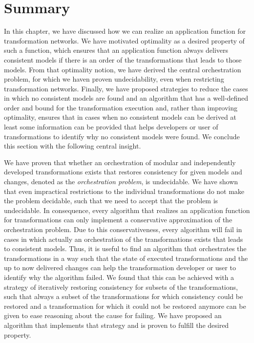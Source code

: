 \section{Summary}

In this chapter, we have discussed how we can realize an application function for transformation networks.
We have motivated optimality as a desired property of such a function, which ensures that an application function always delivers consistent models if there is an order of the transformations that leads to those models. 
From that optimality notion, we have derived the central orchestration problem, for which we haven proven undecidability, even when restricting transformation networks.
Finally, we have proposed strategies to reduce the cases in which no consistent models are found and an algorithm that has a well-defined order and bound for the transformation execution and, rather than improving optimality, ensures that in cases when no consistent models can be derived at least some information can be provided that helps developers or user of transformations to identify why no consistent models were found.
We conclude this section with the following central insight.

\begin{insight}[Orchestration]
    We have proven that whether an orchestration of modular and independently developed transformations exists that restores consistency for given models and changes, denoted as the \emph{orchestration problem}, is undecidable.
    We have shown that even impractical restrictions to the individual transformations do not make the problem decidable, such that we need to accept that the problem is undecidable.
    In consequence, every algorithm that realizes an application function for transformations can only implement a conservative approximation of the orchestration problem.
    Due to this conservativeness, every algorithm will fail in cases in which actually an orchestration of the transformations exists that leads to consistent models.
    Thus, it is useful to find an algorithm that orchestrates the transformations in a way such that the state of executed transformations and the up to now delivered changes can help the transformation developer or user to identify why the algorithm failed.
    We found that this can be achieved with a strategy of iteratively restoring consistency for subsets of the transformations, such that always a subset of the transformations for which consistency could be restored and a transformation for which it could not be restored anymore can be given to ease reasoning about the cause for failing.
    We have proposed an algorithm that implements that strategy and is proven to fulfill the desired property.
\end{insight}